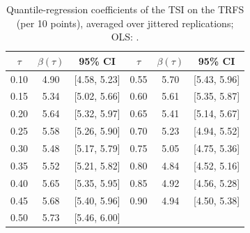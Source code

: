 \begin{table}[!htbp]
\centering
\caption{Mean activity feasibility scores by field of study.}
\label{tab:A-field}
\footnotesize
{}
\end{table}

\begin{table}[!htbp]
\centering
\caption{Quantile-regression coefficients of the TSI on the TRFS (per 10 points), averaged over \QReps{} jittered replications; OLS: \QolsBeta.}
\label{tab:A-quantile}
\footnotesize
\begin{tabular}{ccc|ccc}
\toprule
$\tau$ & $\beta(\tau)$ & 95\% CI & $\tau$ & $\beta(\tau)$ & 95\% CI\\
\midrule
0.10 & 4.90 & [4.58, 5.23] & 0.55 & 5.70 & [5.43, 5.96]\\
0.15 & 5.34 & [5.02, 5.66] & 0.60 & 5.61 & [5.35, 5.87]\\
0.20 & 5.64 & [5.32, 5.97] & 0.65 & 5.41 & [5.14, 5.67]\\
0.25 & 5.58 & [5.26, 5.90] & 0.70 & 5.23 & [4.94, 5.52]\\
0.30 & 5.48 & [5.17, 5.79] & 0.75 & 5.05 & [4.75, 5.36]\\
0.35 & 5.52 & [5.21, 5.82] & 0.80 & 4.84 & [4.52, 5.16]\\
0.40 & 5.65 & [5.35, 5.95] & 0.85 & 4.92 & [4.56, 5.28]\\
0.45 & 5.68 & [5.40, 5.96] & 0.90 & 4.94 & [4.50, 5.38]\\
0.50 & 5.73 & [5.46, 6.00] & & &\\
\bottomrule
\end{tabular}
\end{table}

